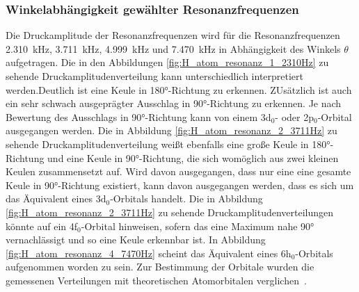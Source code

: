         \subsubsection*{Winkelabhängigkeit gewählter Resonanzfrequenzen}
            Die Druckamplitude der Resonanzfrequenzen wird für die Resonanzfrequenzen \SI{2.310}{\kilo\hertz}, \SI{3.711}{\kilo\hertz}, \SI{4.999}{\kilo\hertz} und \SI{7.470}{\kilo\hertz} in Abhängigkeit des 
            Winkels $\theta$ aufgetragen. Die in den Abbildungen \ref{fig:H_atom_resonanz_1_2310Hz} zu sehende Druckamplitudenverteilung kann unterschiedlich interpretiert werden.Deutlich ist eine Keule in 
            180°-Richtung zu erkennen. ZUsätzlich ist auch ein sehr schwach ausgeprägter Ausschlag in 90°-Richtung zu erkennen. Je nach Bewertung des Ausschlags in 90°-Richtung kann von einem 3d$_0$- oder 
            2p$_0$-Orbital ausgegangen werden. Die in Abbildung \ref{fig:H_atom_resonanz_2_3711Hz} zu sehende Druckamplitudenverteilung weißt ebenfalls eine große Keule in 180°-Richtung und eine Keule in 
            90°-Richtung, die sich womöglich aus zwei kleinen Keulen zusammensetzt auf. Wird davon ausgegangen, dass nur eine eine gesamte Keule in 90°-Richtung existiert, kann davon ausgegangen werden, dass es 
            sich um das Äquivalent eines 3d$_0$-Orbitals handelt. Die in Abbildung \ref{fig:H_atom_resonanz_2_3711Hz} zu sehende Druckamplitudenverteilungen könnte auf ein 4f$_0$-Orbital hinweisen, sofern das 
            eine Maximum nahe 90° vernachlässigt und so eine Keule erkennbar ist. In Abbildung \ref{fig:H_atom_resonanz_4_7470Hz} scheint das Äquivalent eines 6h$_0$-Orbitals aufgenommen worden zu sein. Zur 
            Bestimmung der Orbitale wurden die gemessenen Verteilungen mit theoretischen Atomorbitalen verglichen~\cite{geek3_atomic_2018}.
            \FloatBarrier

